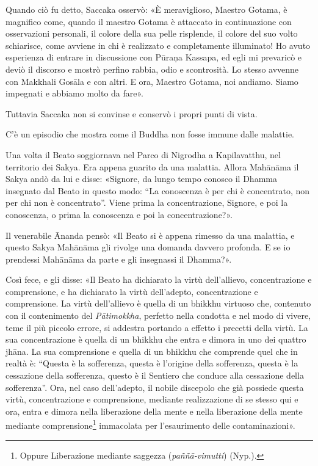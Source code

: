 Quando ciò fu detto, Saccaka osservò: «È meraviglioso, Maestro Gotama, è
magnifico come, quando il maestro Gotama è attaccato in continuazione con
osservazioni personali, il colore della sua pelle risplende, il colore del suo
volto schiarisce, come avviene in chi è realizzato e completamente illuminato!
Ho avuto esperienza di entrare in discussione con Pūraṇa Kassapa, ed egli mi
prevaricò e deviò il discorso e mostrò perfino rabbia, odio e scontrosità. Lo
stesso avvenne con Makkhali Gosāla e con altri. E ora, Maestro Gotama, noi
andiamo. Siamo impegnati e abbiamo molto da fare».


 Tuttavia Saccaka non si convinse e conservò i
propri punti di vista.

 C’è un episodio che mostra come il Buddha non fosse
immune dalle malattie.

 Una volta il Beato soggiornava nel Parco di Nigrodha a
Kapilavatthu, nel territorio dei Sakya. Era appena guarito da una malattia.
Allora Mahānāma il Sakya andò da lui e disse: «Signore, da lungo tempo conosco
il Dhamma insegnato dal Beato in questo modo: “La conoscenza è per chi è
concentrato, non per chi non è concentrato”. Viene prima la concentrazione,
Signore, e poi la conoscenza, o prima la conoscenza e poi la concentrazione?».

Il venerabile Ānanda pensò: «Il Beato si è appena rimesso da una malattia, e
questo Sakya Mahānāma gli rivolge una domanda davvero profonda. E se io
prendessi Mahānāma da parte e gli insegnassi il Dhamma?».

Così fece, e gli disse: «Il Beato ha dichiarato la virtù dell’allievo,
concentrazione e comprensione, e ha dichiarato la virtù dell’adepto,
concentrazione e comprensione. La virtù dell’allievo è quella di un bhikkhu
virtuoso che, contenuto con il contenimento del \emph{Pātimokkha}, perfetto
nella condotta e nel modo di vivere, teme il più piccolo errore, si addestra
portando a effetto i precetti della virtù. La sua concentrazione è quella di un
bhikkhu che entra e dimora in uno dei quattro jhāna. La sua comprensione e
quella di un bhikkhu che comprende quel che in realtà è: “Questa è la
sofferenza, questa è l’origine della sofferenza, questa è la cessazione della
sofferenza, questo è il Sentiero che conduce alla cessazione della sofferenza”.
Ora, nel caso dell’adepto, il nobile discepolo che già possiede questa virtù,
concentrazione e comprensione, mediante realizzazione di se stesso qui e ora,
entra e dimora nella liberazione della mente e nella liberazione della mente
mediante comprensione\footnote{Oppure Liberazione mediante saggezza
  (\emph{paññā-vimutti}) (Nyp.).} immacolata per l’esaurimento delle
contaminazioni».

